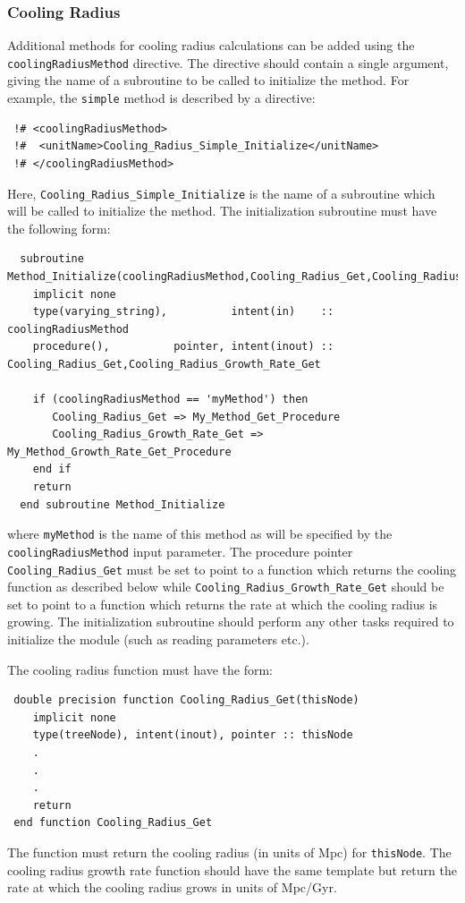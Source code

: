 \subsubsection{Cooling Radius}

Additional methods for cooling radius calculations can be added using the {\tt coolingRadiusMethod} directive. The directive should contain a single argument, giving the name of a subroutine to be called to initialize the method. For example, the {\tt simple} method is described by a directive:
\begin{verbatim}
 !# <coolingRadiusMethod>
 !#  <unitName>Cooling_Radius_Simple_Initialize</unitName>
 !# </coolingRadiusMethod>
\end{verbatim}
Here, {\tt Cooling\_Radius\_Simple\_Initialize} is the name of a subroutine which will be called to initialize the method. The initialization subroutine must have the following form:
\begin{verbatim}
  subroutine Method_Initialize(coolingRadiusMethod,Cooling_Radius_Get,Cooling_Radius_Growth_Rate_Get)
    implicit none
    type(varying_string),          intent(in)    :: coolingRadiusMethod
    procedure(),          pointer, intent(inout) :: Cooling_Radius_Get,Cooling_Radius_Growth_Rate_Get
    
    if (coolingRadiusMethod == 'myMethod') then
       Cooling_Radius_Get => My_Method_Get_Procedure
       Cooling_Radius_Growth_Rate_Get => My_Method_Growth_Rate_Get_Procedure
    end if
    return
  end subroutine Method_Initialize
\end{verbatim}
where {\tt myMethod} is the name of this method as will be specified by the {\tt coolingRadiusMethod} input parameter. The procedure pointer {\tt Cooling\_Radius\_Get} must be set to point to a function which returns the cooling function as described below while {\tt Cooling\_Radius\_Growth\_Rate\_Get} should be set to point to a function which returns the rate at which the cooling radius is growing. The initialization subroutine should perform any other tasks required to initialize the module (such as reading parameters etc.).

The cooling radius function must have the form:
\begin{verbatim}
 double precision function Cooling_Radius_Get(thisNode)
    implicit none
    type(treeNode), intent(inout), pointer :: thisNode
    .
    .
    .
    return
 end function Cooling_Radius_Get
\end{verbatim}
The function must return the cooling radius (in units of Mpc) for {\tt thisNode}. The cooling radius growth rate function should have the same template but return the rate at which the cooling radius grows in units of Mpc/Gyr.


